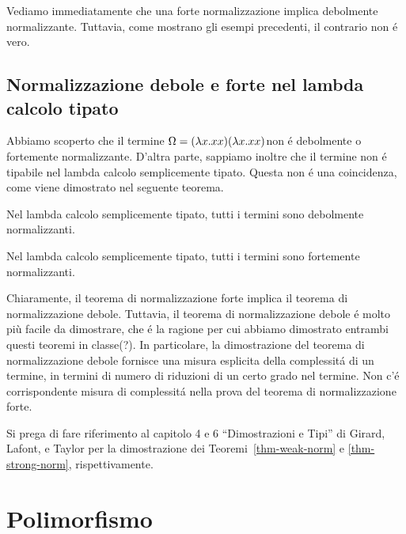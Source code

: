 \documentclass{article}
\begin{document}
Vediamo immediatamente che una forte normalizzazione implica debolmente
normalizzante. Tuttavia, come mostrano gli esempi precedenti, il contrario non \'e
vero.

\subsection{Normalizzazione debole e forte nel lambda calcolo tipato}

Abbiamo scoperto che il termine $\Omega=(\lambda x.xx)(\lambda x.xx)$non \'e debolmente
o fortemente normalizzante. D'altra parte, sappiamo inoltre che
il termine non \'e tipabile nel lambda calcolo semplicemente tipato. Questa non \'e
una coincidenza, come viene dimostrato nel seguente teorema.

\begin{theorem}\label{thm-weak-norm}
	Nel  lambda calcolo semplicemente tipato, tutti i termini sono debolmente
	normalizzanti.
\end{theorem}

\begin{theorem}\label{thm-strong-norm}
	Nel  lambda calcolo semplicemente tipato, tutti i termini sono fortemente
	normalizzanti.
\end{theorem}

Chiaramente, il  teorema di normalizzazione forte implica il 
teorema di normalizzazione debole. Tuttavia, il  teorema di normalizzazione debole \'e molto
pi\`u facile da dimostrare, che \'e la ragione per cui abbiamo dimostrato entrambi questi teoremi in
classe(?). In particolare, la dimostrazione del teorema di normalizzazione debole 
fornisce una misura esplicita della complessit\'a di un termine, in termini di
numero di riduzioni di un certo grado nel termine. Non c'\'e
corrispondente misura di complessit\'a nella prova del
teorema di normalizzazione forte.

Si prega di fare riferimento al capitolo 4 e 6  ``Dimostrazioni e Tipi'' di
Girard, Lafont, e Taylor {\cite{GLT89}} per la dimostrazione dei 
Teoremi~\ref{thm-weak-norm} e {\ref{thm-strong-norm}},
rispettivamente. 

\section{Polimorfismo}
\end{document}
